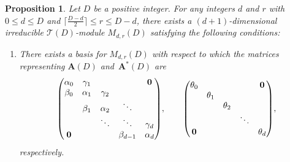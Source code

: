 \documentclass[10pt,a4paper]{amsart}
\def\A{\mathbf A}
\def\T{\mathcal T}
\numberwithin{equation}{section}
\newtheorem{Proposition}[Theorem]{Proposition}
 { \theoremstyle{definition}
\newtheorem{Definition}[Theorem]{Definition}
\newtheorem{Note}[Theorem]{Note}
\newtheorem{Example}[Theorem]{Example}
\newtheorem{Remark}[Theorem]{Remark} }
\begin{document}
\begin{Proposition}\label{prop2:Kpk}
Let $D$ be a positive integer.
For any integers $d$ and $r$ with $0\leq d\leq D$ and $\big\lceil \frac{D-d}{2}\big\rceil\leq r\leq D-d$, there exists a $(d+1)$-dimensional irreducible $\T(D)$-module $M_{d,r}(D)$ satisfying the following conditions:
\begin{enumerate}\itemsep=0pt
\item[$(i)$] There exists a basis for $M_{d,r}(D)$ with respect to which the matrices representing $\A(D)$ and~$\A^*(D)$ are
\begin{gather*}
\begin{pmatrix}
\alpha_0 &\gamma_1 & & &{\bf 0}
\\
\beta_0 &\alpha_1 &\gamma_2
\\
&\beta_1 &\alpha_2 &\ddots
 \\
& &\ddots &\ddots &\gamma_d
 \\
{\bf 0} & & &\beta_{d-1} &\alpha_d
\end{pmatrix}\!,
\qquad
\begin{pmatrix}
\theta_0 & & & &{\bf 0}
\\
 &\theta_1
\\
 & &\theta_2
 \\
 & & &\ddots
 \\
{\bf 0} & & & &\theta_d
\end{pmatrix}\!,
\end{gather*}
respectively.


\end{enumerate}
\end{Proposition}
\end{document}

